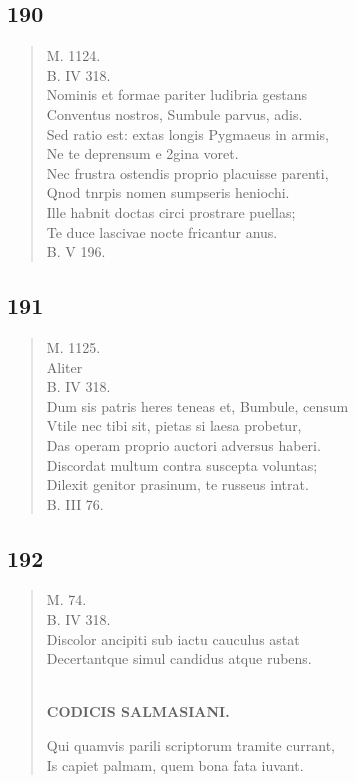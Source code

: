 \documentclass[11pt, a4paper]{report}
\begin{document}
            \subsection*{190}
      \begin{verse}
      M. 1124. \\ B. IV 318. \\ Nominis et formae pariter ludibria gestans \\ Conventus nostros, Sumbule parvus, adis. \\ Sed ratio est: extas longis Pygmaeus in armis, \\ Ne te deprensum e 2gina voret. \\ Nec frustra ostendis proprio placuisse parenti, \\ Qnod tnrpis nomen sumpseris heniochi. \\ Ille habnit doctas circi prostrare puellas; \\ Te duce lascivae nocte fricantur anus. \\ B. V 196. \\ 
      \end{verse}
  
            \subsection*{191}
      \begin{verse}
      M. 1125. \\ Aliter \\ B. IV 318. \\ Dum sis patris heres teneas et, Bumbule, censum \\ Vtile nec tibi sit, pietas si laesa probetur, \\ Das operam proprio auctori adversus haberi. \\ Discordat multum contra suscepta voluntas; \\ Dilexit genitor prasinum, te russeus intrat. \\ B. III 76. \\ 
      \end{verse}
  
            \subsection*{192}
      \begin{verse}
      M. 74. \\ B. IV 318. \\ Discolor ancipiti sub iactu cauculus astat \\ Decertantque simul candidus atque rubens. \\ 
        ﻿\pagebreak 
    \begin{center} \textbf{CODICIS SALMASIANI.} \end{center} \marginpar{[159]} Qui quamvis parili scriptorum tramite currant, \\ Is capiet palmam, quem bona fata iuvant. \\ 
      \end{verse}
  
\end{document}
